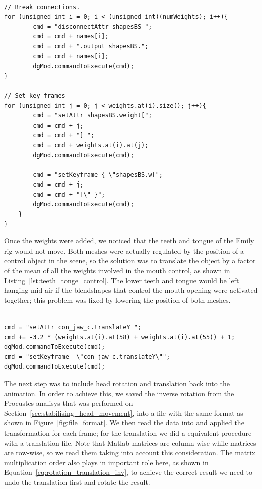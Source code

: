 \begin{lstlisting}[caption = Breaking the weights connections and setting keyframes., label = lst:set_weights, frame=single]

// Break connections.
for (unsigned int i = 0; i < (unsigned int)(numWeights); i++){
		cmd = "disconnectAttr shapesBS_";
		cmd = cmd + names[i];
		cmd = cmd + ".output shapesBS.";
		cmd = cmd + names[i];
		dgMod.commandToExecute(cmd);
}

// Set key frames
for (unsigned int j = 0; j < weights.at(i).size(); j++){
		cmd = "setAttr shapesBS.weight[";
		cmd = cmd + j;
		cmd = cmd + "] ";
		cmd = cmd + weights.at(i).at(j);
		dgMod.commandToExecute(cmd);
		
		cmd = "setKeyframe { \"shapesBS.w[";
		cmd = cmd + j;
		cmd = cmd + "]\" }";
		dgMod.commandToExecute(cmd);
	}
}
\end{lstlisting}

Once the weights were added, we noticed that the teeth and tongue of the Emily rig would not move.
Both meshes were actually regulated by the position of a control object in the scene, so the solution was to translate the object by a factor of the mean of all the weights involved in the mouth control, as shown in Listing~\ref{lst:teeth_tonge_control}.
The lower teeth and tongue would be left hanging mid air if the blendshapes that control the mouth opening were activated together; this problem was fixed by lowering the position of both meshes.

\begin{lstlisting}[caption = Teeth and tongue control based on relevant weights., label = lst:teeth_tonge_control, frame=single]

cmd = "setAttr con_jaw_c.translateY ";
cmd += -3.2 * (weights.at(i).at(58) + weights.at(i).at(55)) + 1;
dgMod.commandToExecute(cmd);
cmd = "setKeyframe  \"con_jaw_c.translateY\"";
dgMod.commandToExecute(cmd);
\end{lstlisting}

The next step was to include head rotation and translation back into the animation.
In order to achieve this, we saved the inverse rotation from the Procustes analisys that was performed on Section~\ref{sec:stabilising_head_movement}, into a file with the same format as shown in Figure~\ref{fig:file_format}.
We then read the data into \Maya and applied the transformation for each frame; for the translation we did a equivalent procedure with a translation file.
Note that Matlab matrices are column-wise while \Maya matrices are row-wise, so we read them taking into account this consideration.
The matrix multiplication order also plays in important role here, as shown in Equation~\ref{eq:rotation_translation_inv}, to achieve the correct result we need to undo the translation first and rotate the result.

